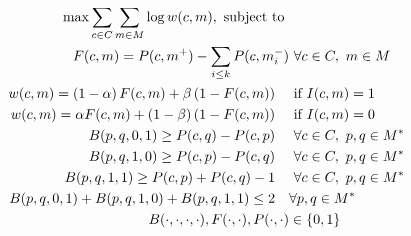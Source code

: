 \documentclass[a4paper,USenglish]{article}
\theoremstyle{definition}
\begin{document}
\begin{align}
  \max \sum_{c\in C}\sum_{m\in M}\log w(c,m),\text{ subject to }&\notag\\
  F(c,m) = P(c,m^{+}) - \sum_{i\le k} P(c, m_{i}^{-}) &\ \forall c\in C,\ m\in M\label{eq:def-F}\\
  w(c,m) = \left(1 - \alpha\right) F(c,m) +  \beta \left( 1 - F(c,m) \right)\quad&\text{ if } I(c,m) = 1\label{eq:cost-FP}\\
  w(c,m) = \alpha F(c,m) +  \left(1 - \beta\right) \left( 1 - F(c,m) \right)\quad&\text{ if } I(c,m) = 0\label{eq:cost-FN}\\
  B(p,q,0,1)\ge P(c,q) - P(c,p) \quad&\ \forall c\in C,\ p,q\in M^{*}\label{eq:case-01}\\
  B(p,q,1,0)\ge P(c,p) - P(c,q) \quad&\ \forall c\in C,\ p,q\in M^{*}\label{eq:case-10}\\
  B(p,q,1,1)\ge P(c,p) + P(c,q) -1 \quad&\ \forall  c\in C,\ p,q\in M^{*}\label{eq:case-11}\\
  B(p,q,0,1) + B(p,q,1,0) + B(p,q,1,1)\le 2  \quad&\forall  p,q\in M^{*}\label{eq:no-conflict}\\
  B(\cdot,\cdot,\cdot,\cdot), F(\cdot,\cdot), P(\cdot,\cdot)&\in \{0,1\}\notag
\end{align}






\end{document}
